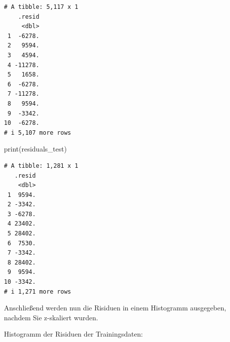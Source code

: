 \documentclass[
  letterpaper,
  DIV=11,
  numbers=noendperiod]{scrartcl}
\newenvironment{Shaded}{\begin{snugshade}}{\end{snugshade}}
\newcommand{\AttributeTok}[1]{\textcolor[rgb]{0.40,0.45,0.13}{#1}}
\newcommand{\DecValTok}[1]{\textcolor[rgb]{0.68,0.00,0.00}{#1}}
\newcommand{\FloatTok}[1]{\textcolor[rgb]{0.68,0.00,0.00}{#1}}
\newcommand{\FunctionTok}[1]{\textcolor[rgb]{0.28,0.35,0.67}{#1}}
\newcommand{\NormalTok}[1]{\textcolor[rgb]{0.00,0.23,0.31}{#1}}
\newcommand{\OtherTok}[1]{\textcolor[rgb]{0.00,0.23,0.31}{#1}}
\newcommand{\SpecialCharTok}[1]{\textcolor[rgb]{0.37,0.37,0.37}{#1}}
\newcommand{\StringTok}[1]{\textcolor[rgb]{0.13,0.47,0.30}{#1}}
\begin{document}
\begin{verbatim}
# A tibble: 5,117 x 1
    .resid
     <dbl>
 1  -6278.
 2   9594.
 3   4594.
 4 -11278.
 5   1658.
 6  -6278.
 7 -11278.
 8   9594.
 9  -3342.
10  -6278.
# i 5,107 more rows
\end{verbatim}

\begin{Shaded}
\begin{Highlighting}[]
\FunctionTok{print}\NormalTok{(residuals\_test)}
\end{Highlighting}
\end{Shaded}

\begin{verbatim}
# A tibble: 1,281 x 1
   .resid
    <dbl>
 1  9594.
 2 -3342.
 3 -6278.
 4 23402.
 5 28402.
 6  7530.
 7 -3342.
 8 28402.
 9  9594.
10 -3342.
# i 1,271 more rows
\end{verbatim}

Anschließend werden nun die Risiduen in einem Histogramm ausgegeben,
nachdem Sie z-skaliert wurden.

Histogramm der Risiduen der Trainingsdaten:

\begin{Shaded}
\end{Shaded}
\end{document}
